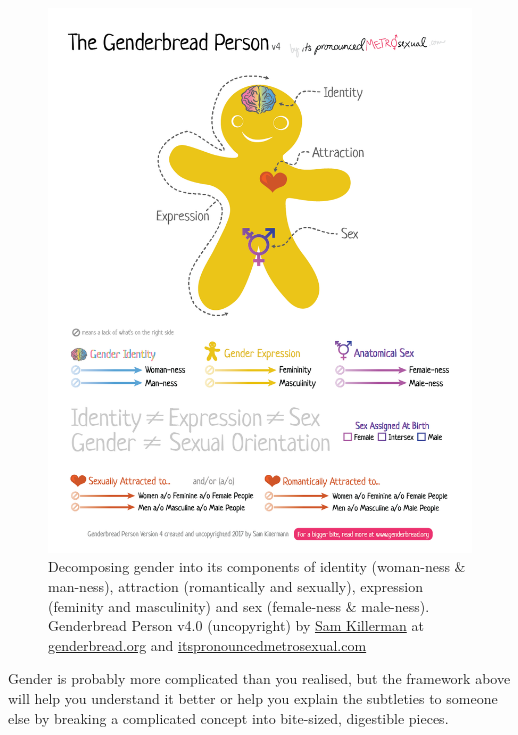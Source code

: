\documentclass[
]{book}
\begin{document}
\begin{figure}

{\centering \includegraphics[width=1\linewidth]{images/Genderbread-Person-v4} 

}

\caption{Decomposing gender into its components of identity (woman-ness \& man-ness), attraction (romantically and sexually), expression (feminity and masculinity) and sex (female-ness \& male-ness). Genderbread Person v4.0 (uncopyright) by \href{https://www.samkillermann.com/}{Sam Killerman} at \href{https://www.genderbread.org/}{genderbread.org} and \href{https://www.itspronouncedmetrosexual.com/}{itspronouncedmetrosexual.com}}\label{fig:genderbread-fig}
\end{figure}



Gender is probably more complicated than you realised, but the framework above will help you understand it better or help you explain the subtleties to someone else by breaking a complicated concept into bite-sized, digestible pieces.
\end{document}

